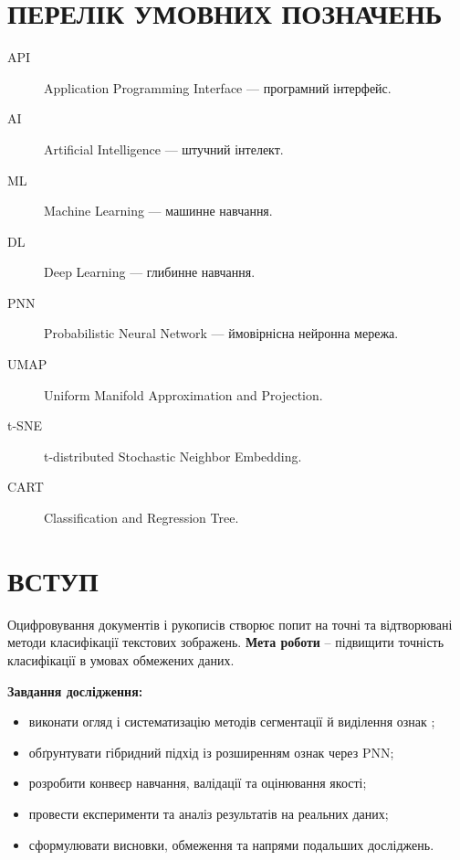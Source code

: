 \documentclass{article}
\begin{document}
\clearpage
\tableofcontents
\clearpage

\section*{ПЕРЕЛІК УМОВНИХ ПОЗНАЧЕНЬ}
\begin{description}
  \item[API] Application Programming Interface --- програмний інтерфейс.
  \item[AI] Artificial Intelligence --- штучний інтелект.
  \item[ML] Machine Learning --- машинне навчання.
  \item[DL] Deep Learning --- глибинне навчання.
  \item[PNN] Probabilistic Neural Network --- ймовірнісна нейронна мережа.
  \item[UMAP] Uniform Manifold Approximation and Projection.
  \item[t-SNE] t-distributed Stochastic Neighbor Embedding.
  \item[CART] Classification and Regression Tree.
\end{description}
\clearpage

\section*{ВСТУП}
Оцифровування документів і рукописів створює попит на точні та відтворювані методи
класифікації текстових зображень. \textbf{Мета роботи} -- підвищити точність класифікації в
умовах обмежених даних.

\textbf{Завдання дослідження:}
\begin{itemize}
  \item виконати огляд і систематизацію методів сегментації й виділення ознак \cite{otsu1979,canny1986};
  \item обґрунтувати гібридний підхід із розширенням ознак через PNN;
  \item розробити конвеєр навчання, валідації та оцінювання якості;
  \item провести експерименти та аналіз результатів на реальних даних;
  \item сформулювати висновки, обмеження та напрями подальших досліджень.
\end{itemize}
\end{document}
